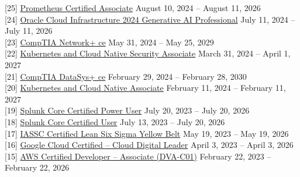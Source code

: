 \documentclass[10pt]{res} %
\begin{document}
\begin{resume}
{[25]} \phantom{0}\href{https://www.credly.com/badges/fe0f2039-017b-4e0a-9129-72aa2a2a1a4e}{\color{blue}Prometheus Certified Associate} \hfill August 10, 2024 -- August 11, 2026 \\
{[24]} \phantom{0}\href{https://catalog-education.oracle.com/pls/certview/sharebadge?id=9F6541DFD004D9E0F856E094EB2177D96FF5F79D910BC1905C5DB967572E1E19}{\color{blue}Oracle Cloud Infrastructure 2024 Generative AI Professional} \hfill July 11, 2024 -- July 11, 2026 \\
{[23]} \phantom{0}\href{https://www.credly.com/badges/b51e02f2-a8aa-4769-8819-92d87f9d0a83}{\color{blue}CompTIA Network+ ce} \hfill May 31, 2024 -- May 25, 2029 \\
{[22]} \phantom{0}\href{https://www.credly.com/badges/9fcf8dcc-b346-4dab-86e2-ca627e1d8f52}{\color{blue}Kubernetes and Cloud Native Security Associate} \hfill March 31, 2024 -- April 1, 2027 \\
{[21]} \phantom{0}\href{https://www.credly.com/badges/3fa2a26f-c6d8-44c7-97ec-a85ac42b3188}{\color{blue}CompTIA DataSys+ ce} \hfill February 29, 2024 -- February 28, 2030 \\
{[20]} \phantom{0}\href{https://www.credly.com/badges/66cc4fe8-8625-4584-bf3f-b6269f3ce7d0}{\color{blue}Kubernetes and Cloud Native Associate} \hfill February 11, 2024 -- February 11, 2027 \\
{[19]} \phantom{0}\href{https://www.credly.com/badges/c6bd3fca-98d5-47b6-bd96-d520f2dba0f6}{\color{blue}Splunk Core Certified Power User} \hfill July 20, 2023 -- July 20, 2026 \\
{[18]} \phantom{0}\href{https://www.credly.com/badges/2db171e7-4605-4000-a2a0-5fdc5a8552d1}{\color{blue}Splunk Core Certified User} \hfill July 13, 2023 --  July 20, 2026 \\
{[17]} \phantom{0}\href{https://badges.peoplecert.org/Badge/en/2/F33CC705-FC46-495E-B84D-B2DC8F5B932F?162}{\color{blue}IASSC\textsuperscript{\textregistered} Certified Lean Six Sigma Yellow Belt\texttrademark} \hfill May 19, 2023 -- May 19, 2026 \\
{[16]} \phantom{0}\href{https://www.credly.com/badges/89c06805-bcb1-4b88-9f3c-19ecaf0f4841}{\color{blue}Google Cloud Certified -- Cloud Digital Leader} \hfill April 3, 2023 -- April 3, 2026 \\
{[15]} \phantom{0}\href{https://www.credly.com/badges/630ff6cc-7848-48e3-acce-aac2d8017a5e}{\color{blue}AWS Certified Developer -- Associate (DVA-C01)} \hfill February 22, 2023 -- February 22, 2026 \\

\end{resume}
\end{document}
